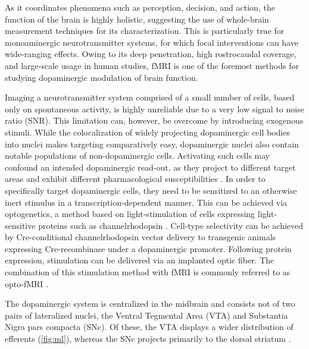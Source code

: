 As it coordinates phenomena such as perception, decision, and action, the function of the brain is highly holistic, suggesting the use of whole-brain measurement techniques for its characterization.
This is particularly true for monoaminergic neurotransmitter systems, for which focal interventions can have wide-ranging effects.
Owing to its deep penetration, high rostrocaudal coverage, and large-scale usage in human studies, fMRI is one of the foremost methods for studying dopaminergic modulation of brain function.

Imaging a neurotransmitter system comprised of a small number of cells, based only on spontaneous activity, is highly unreliable due to a very low signal to noise ratio (SNR).
This limitation can, however, be overcome by introducing exogenous stimuli.
While the colocalization of widely projecting dopaminergic cell bodies into nuclei makes targeting comparatively easy, dopaminergic nuclei also contain notable populations of non-dopaminergic cells.
Activating such cells may confound an intended dopaminergic read-out, as they project to different target areas and exhibit different pharmacological susceptibilities \cite{Taylor2014}.
In order to specifically target dopaminergic cells, they need to be sensitized to an otherwise inert stimulus in a transcription-dependent manner.
This can be achieved via optogenetics, a method based on light-stimulation of cells expressing light-sensitive proteins such as channelrhodopsin \cite{Boyden2005}.
Cell-type selectivity can be achieved by Cre-conditional channelrhodopsin vector delivery \cite{Orban1992} to transgenic animals expressing Cre-recombinase under a dopaminergic promoter.
Following protein expression, stimulation can be delivered via an implanted optic fiber.
The combination of this stimulation method with fMRI is commonly referred to as opto-fMRI \cite{Desai2011,Grandjean2019}.

The dopaminergic system is centralized in the midbrain and consists not of two pairs of lateralized nuclei, the Ventral Tegmental Area (VTA) and Substantia Nigra pars compacta (SNc).
Of these, the VTA displays a wider distribution of efferents (\cref{fig:ml}), whereas the SNc projects primarily to the dorsal striatum \cite{Pan2010}.


